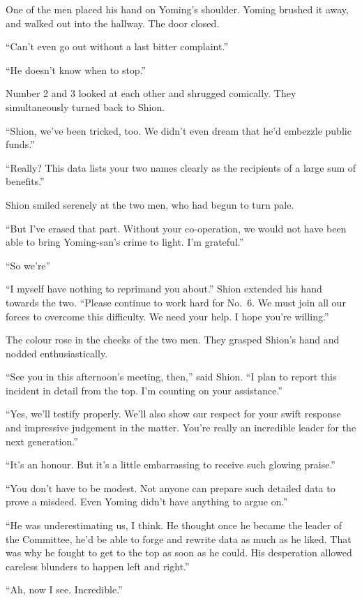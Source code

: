 One of the men placed his hand on Yoming's shoulder. Yoming brushed it
away, and walked out into the hallway. The door closed.

``Can't even go out without a last bitter complaint.''

``He doesn't know when to stop.''

Number 2 and 3 looked at each other and shrugged comically. They
simultaneously turned back to Shion.

``Shion, we've been tricked, too. We didn't even dream that he'd
embezzle public funds.''

``Really? This data lists your two names clearly as the recipients of a
large sum of benefits.''

Shion smiled serenely at the two men, who had begun to turn pale.

``But I've erased that part. Without your co-operation, we would not
have been able to bring Yoming-san's crime to light. I'm grateful.''

``So we're\el ''

``I myself have nothing to reprimand you about.'' Shion extended his
hand towards the two. ``Please continue to work hard for No.~6. We must
join all our forces to overcome this difficulty. We need your help. I
hope you're willing.''

The colour rose in the cheeks of the two men. They grasped Shion's hand
and nodded enthusiastically.

``See you in this afternoon's meeting, then,'' said Shion. ``I plan to
report this incident in detail from the top. I'm counting on your
assistance.''

``Yes, we'll testify properly. We'll also show our respect for your
swift response and impressive judgement in the matter. You're really an
incredible leader for the next generation.''

``It's an honour. But it's a little embarrassing to receive such glowing
praise.''

``You don't have to be modest. Not anyone can prepare such detailed data
to prove a misdeed. Even Yoming didn't have anything to argue on.''

``He was underestimating us, I think. He thought once he became the
leader of the Committee, he'd be able to forge and rewrite data as much
as he liked. That was why he fought to get to the top as soon as he
could. His desperation allowed careless blunders to happen left and
right.''

``Ah, now I see. Incredible.''

